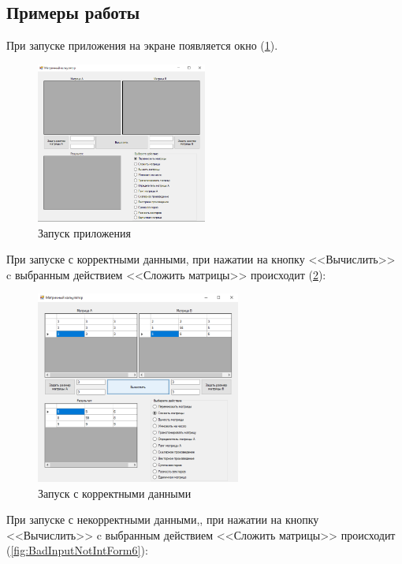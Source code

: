 \subsection{Примеры работы}

При запуске приложения на экране появляется окно (\ref{fig:StartForm6}).

\newpage

\begin{figure}[!h]
    \centering
    \includegraphics[width = 0.5\textwidth]{images/Task6/Start.png}
    \caption{Запуск приложения}
    \label{fig:StartForm6}
\end{figure}

При запуске с корректными данными, при нажатии на кнопку <<Вычислить>> c выбранным действием <<Сложить матрицы>> происходит (\ref{fig:WorkForm6}):

\begin{figure}[!h]
    \centering
    \includegraphics[width = 0.6\textwidth]{images/Task6/WorkSum.png}
    \caption{Запуск с корректными данными}
    \label{fig:WorkForm6}
\end{figure}

При запуске с некорректными данными,, при нажатии на кнопку <<Вычислить>> c выбранным действием <<Сложить матрицы>> происходит (\ref{fig:BadInputNotIntForm6}):

